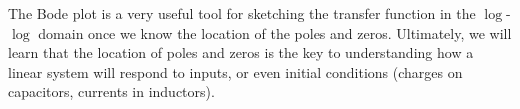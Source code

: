 The Bode plot is a very useful tool for sketching the transfer function in the $\log$-$\log$ domain once we know the location of the poles and zeros.  Ultimately, we will learn that the location of poles and zeros is the key to understanding how a linear system will respond to inputs, or even initial conditions (charges on capacitors, currents in inductors).
